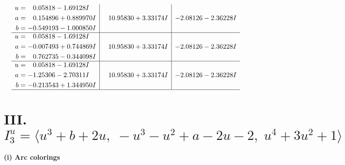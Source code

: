 \documentclass[1p]{elsarticle_modified}
\theoremstyle{definition}
\begin{document}
$$\begin{array}{c|c|c}
\begin{aligned}
u &= \phantom{-}0.05818 - 1.69128 I \\
a &= \phantom{-}0.154896 + 0.889970 I \\
b &= -0.549193 - 1.000850 I\end{aligned}
 & \phantom{-}10.95830 + 3.33174 I & -2.08126 - 2.36228 I \\ \hline\begin{aligned}
u &= \phantom{-}0.05818 - 1.69128 I \\
a &= -0.007493 + 0.744869 I \\
b &= \phantom{-}0.762735 - 0.344098 I\end{aligned}
 & \phantom{-}10.95830 + 3.33174 I & -2.08126 - 2.36228 I \\ \hline\begin{aligned}
u &= \phantom{-}0.05818 - 1.69128 I \\
a &= -1.25306 - 2.70311 I \\
b &= -0.213543 + 1.344950 I\end{aligned}
 & \phantom{-}10.95830 + 3.33174 I & -2.08126 - 2.36228 I\\
 \hline 
 \end{array}$$\newpage\newpage\renewcommand{\arraystretch}{1}
\centering \section*{III. $I^u_{3}= \langle u^3+b+2 u,\;- u^3- u^2+a-2 u-2,\;u^4+3 u^2+1 \rangle$}
\flushleft \textbf{(i) Arc colorings}\\
\end{document}

